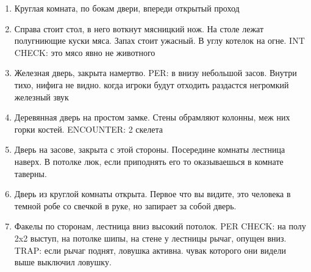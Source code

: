 \documentclass[a5paper,11pt]{book}
\begin{document}
\begin{multicols}{2}
\begin{enumerate}
\item Круглая комната, по бокам двери, впереди открытый проход
\item Справа стоит стол, в него воткнут мясницкий нож. На столе лежат полугниющие куски мяса. Запах стоит ужасный. В углу котелок на огне. INT CHECK: это мясо явно не животного
\item Железная дверь, закрыта намертво. PER: в внизу небольшой засов. Внутри тихо, нифига не видно. когда игроки будут отходить раздастся негромкий железный звук
\item Деревянная дверь на простом замке. Стены обрамляют колонны, меж них горки костей. ENCOUNTER: 2 скелета
\item Дверь на засове, закрыта с этой стороны. Посередине комнаты лестница наверх. В потолке люк, если приподнять его то оказываешься в комнате таверны.
\item Дверь из круглой комнаты открыта. Первое что вы видите, это человека в темной робе со свечкой в руке, но запирает за собой дверь.
\item Факелы по сторонам, лестница вниз высокий потолок. PER CHECK: на полу 2x2 выступ,  на потолке шипы, на стене у лестницы рычаг, опущен вниз. TRAP: если рычаг поднят, ловушка активна. чувак которого они видели выше выключил ловушку.
\end{enumerate}


\end{multicols}
\end{document}
